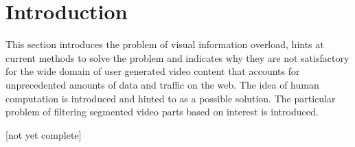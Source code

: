 \chapter{Introduction}
\label{ch:introduction}

This section introduces the problem of visual information overload, hints at current methods to solve the problem and indicates why they are not satisfactory for the wide domain of user generated video content that accounts for unprecedented amounts of data and traffic on the web. The idea of human computation is introduced and hinted to as a possible solution. The particular problem of filtering segmented video parts based on interest is introduced.

[not yet complete]